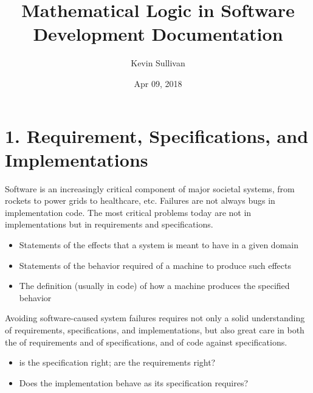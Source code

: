 \documentclass[letterpaper,10pt,english]{sphinxmanual}
\title{Mathematical Logic in Software Development Documentation}
\date{Apr 09, 2018}
\author{Kevin Sullivan}
\begin{document}
\maketitle
\sphinxtableofcontents
{}\label{\detokenize{index::doc}}



\chapter{1. Requirement, Specifications, and Implementations}
\label{\detokenize{01-reqs-specs-impls::doc}}\label{\detokenize{01-reqs-specs-impls:requirement-specifications-and-implementations}}\label{\detokenize{01-reqs-specs-impls:welcome-to-mathematical-logic-in-software-development}}
Software is an increasingly critical component of major societal
systems, from rockets to power grids to healthcare, etc. Failures are
not always bugs in implementation code. The most critical problems
today are not in implementations but in requirements and
specifications.
\begin{itemize}
\item {} 
 Statements of the effects that a system is meant to have in a given domain

\item {} 
 Statements of the behavior required of a machine to produce such effects

\item {} 
 The definition (usually in code) of how a machine produces the specified behavior

\end{itemize}

Avoiding software-caused system failures requires not only a solid
understanding of requirements, specifications, and implementations,
but also great care in both the  of requirements and of
specifications, and  of code against specifications.
\begin{itemize}
\item {} 
  is the specification right; are the requirements right?

\item {} 
  Does the implementation behave as its specification requires?

\end{itemize}
\end{document}
